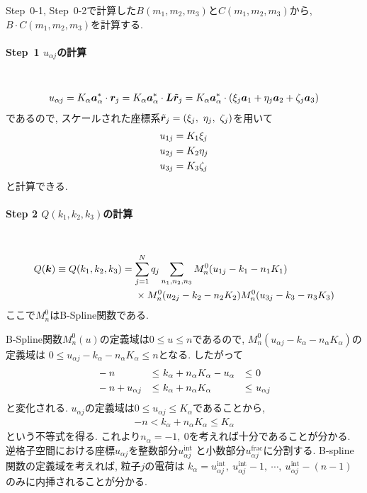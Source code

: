 Step~0-1, Step~0-2で計算した$B(m_{1}, m_{2}, m_{3})$と$C(m_{1}, m_{2}, m_{3})$から,
$B \cdot C (m_{1}, m_{2}, m_{3})$を計算する.
\\

\paragraph{Step~1 $u_{\alpha j}$の計算} \
\begin{align}
    u_{\alpha j }
  =
    K_{\alpha} \bm{a}_{\alpha}^{*} \cdot \bm{r}_{j}
  =
    K_{\alpha} \bm{a}_{\alpha}^{*} \cdot \bm{L} \Tilde{\bm{r}}_{j}
  =
    K_{\alpha} \bm{a}_{\alpha}^{*}
    \cdot
    (\xi_{j} \bm{a}_{1} + \eta_{j} \bm{a}_{2} + \zeta_{j}\bm{a}_{3})
 \notag
\end{align}
であるので, スケールされた座標系$\Tilde{\bm{r}}_{j}=(\xi_{j},~ \eta_{j},~ \zeta_{j})$を用いて
\begin{align}
 u_{1j} &= K_{1} \xi_{j}   \notag \\
 u_{2j} &= K_{2} \eta_{j}  \notag \\
 u_{3j} &= K_{3} \zeta_{j} \notag
\end{align}
と計算できる.

\paragraph{Step 2 $Q(k_{1}, k_{2}, k_{3})$の計算} \
\begin{align}
    Q(\bm{k})
 \equiv
    Q(k_{1}, k_{2}, k_{3})
 &=
    \sum_{j=1}^{N} q_{j} \sum_{n_{1}, n_{2}, n_{3}}
    M_{n}^{0}(u_{1j}- k_{1} - n_{1}K_{1})
 \notag
 \\ &~~~~ \times
    M_{n}^{0}(u_{2j} - k_{2} - n_{2}K_{2}) M_{n}^{0}(u_{3j} - k_{3} - n_{3}K_{3})
 \notag
\end{align}
ここで$M_{n}^{0}$はB-Spline関数である.

B-Spline関数$M_{n}^{0}(u)$の定義域は$0 \le u \le n$であるので,
$M_{n}^{0}(u_{\alpha j} - k_{\alpha} - n_{\alpha}K_{\alpha})$の定義域は
$0 \le u_{\alpha j} - k_{\alpha} - n_{\alpha}K_{\alpha} \le n$となる.
したがって
\begin{alignat}{5}
  &-n                &\le &~ k_{\alpha} + n_{\alpha}K_{\alpha} - u_{\alpha} &\le &~0
 \notag
 \\
  &-n + u_{\alpha j} &\le &~ k_{\alpha} + n_{\alpha}K_{\alpha}              &\le &~u_{\alpha j}
\end{alignat}
と変化される.
$u_{\alpha j}$の定義域は$0 \le u_{\alpha j} \le K_{\alpha}$であることから,
\begin{align}
 -n < k_{\alpha} + n_{\alpha} K_{\alpha} \le K_{\alpha}
\end{align}
という不等式を得る.
これより$n_{\alpha} = -1,~ 0$を考えれば十分であることが分かる.
逆格子空間における座標$u_{\alpha j}$を整数部分$u_{\alpha j}^{\mathrm{int}}$
と小数部分$u_{\alpha j}^{\mathrm{frac}}$に分割する.
B-spline関数の定義域を考えれば, 粒子$j$の電荷は
$k_{\alpha} = u_{\alpha j}^{\mathrm{int}},~ u_{\alpha j}^{\mathrm{int}}-1,~ \cdots,~ u_{\alpha j}^{\mathrm{int}} - (n - 1)$
のみに内挿されることが分かる.


